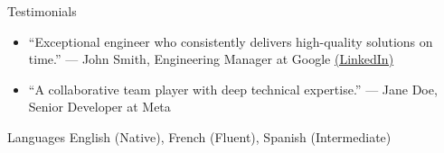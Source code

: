 \documentclass{resume} %
\begin{document}
\begin{rSection}{Testimonials}
\begin{itemize}
    \itemsep -3pt {}
    \item ``Exceptional engineer who consistently delivers high-quality solutions on time.'' --- John Smith, Engineering Manager at Google \href{https://linkedin.com/in/johnsmith}{(LinkedIn)}
    \item ``A collaborative team player with deep technical expertise.'' --- Jane Doe, Senior Developer at Meta
\end{itemize}
\end{rSection}

\begin{rSection}{Languages}
English (Native), French (Fluent), Spanish (Intermediate)
\end{rSection}
\end{document}
